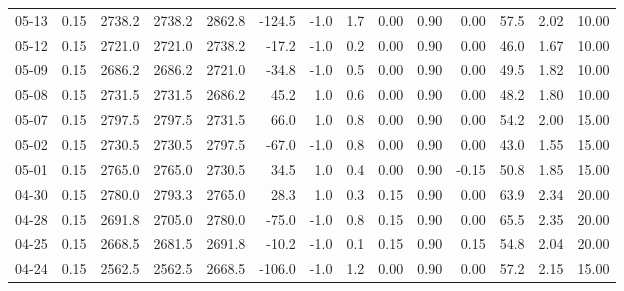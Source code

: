 \begin{threeparttable}
{\begin{tabular}{lrrrrrrrrrrrrr}
  05-13 &     0.15 & 2738.2 & 2738.2 & 2862.8 &     -124.5 &                     -1.0 &                 1.7 &       0.00 &      0.90 &           0.00 &             57.5 &            2.02 &                  10.00 \\
  05-12 &     0.15 & 2721.0 & 2721.0 & 2738.2 &      -17.2 &                     -1.0 &                 0.2 &       0.00 &      0.90 &           0.00 &             46.0 &            1.67 &                  10.00 \\
  05-09 &     0.15 & 2686.2 & 2686.2 & 2721.0 &      -34.8 &                     -1.0 &                 0.5 &       0.00 &      0.90 &           0.00 &             49.5 &            1.82 &                  10.00 \\
  05-08 &     0.15 & 2731.5 & 2731.5 & 2686.2 &       45.2 &                      1.0 &                 0.6 &       0.00 &      0.90 &           0.00 &             48.2 &            1.80 &                  10.00 \\
  05-07 &     0.15 & 2797.5 & 2797.5 & 2731.5 &       66.0 &                      1.0 &                 0.8 &       0.00 &      0.90 &           0.00 &             54.2 &            2.00 &                  15.00 \\
  05-02 &     0.15 & 2730.5 & 2730.5 & 2797.5 &      -67.0 &                     -1.0 &                 0.8 &       0.00 &      0.90 &           0.00 &             43.0 &            1.55 &                  15.00 \\
  05-01 &     0.15 & 2765.0 & 2765.0 & 2730.5 &       34.5 &                      1.0 &                 0.4 &       0.00 &      0.90 &          -0.15 &             50.8 &            1.85 &                  15.00 \\
  04-30 &     0.15 & 2780.0 & 2793.3 & 2765.0 &       28.3 &                      1.0 &                 0.3 &       0.15 &      0.90 &           0.00 &             63.9 &            2.34 &                  20.00 \\
  04-28 &     0.15 & 2691.8 & 2705.0 & 2780.0 &      -75.0 &                     -1.0 &                 0.8 &       0.15 &      0.90 &           0.00 &             65.5 &            2.35 &                  20.00 \\
  04-25 &     0.15 & 2668.5 & 2681.5 & 2691.8 &      -10.2 &                     -1.0 &                 0.1 &       0.15 &      0.90 &           0.15 &             54.8 &            2.04 &                  20.00 \\
  04-24 &     0.15 & 2562.5 & 2562.5 & 2668.5 &     -106.0 &                     -1.0 &                 1.2 &       0.00 &      0.90 &           0.00 &             57.2 &            2.15 &                  15.00 \\

\end{tabular}}
\end{threeparttable}
